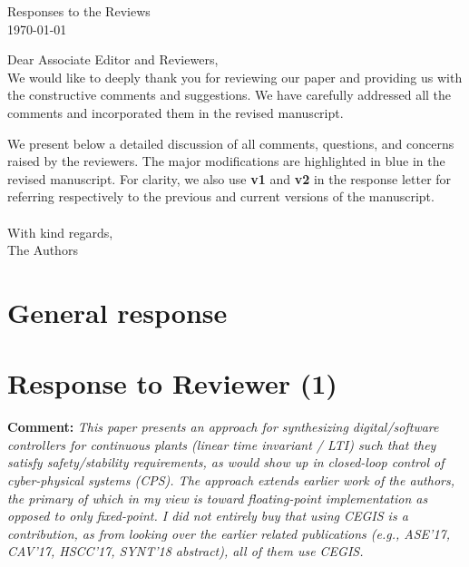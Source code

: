 \documentclass{article}
\newcommand{\vold}[1]{\colorbox{red!20}{\bfseries #1}}
\newcommand{\vnew}[1]{\colorbox{blue!30}{\bfseries #1}}
\begin{document}
\begin{center}
{\Large Responses to the Reviews}\\\vspace{0.3cm}
\today
\end{center}
\vspace{1cm}
Dear Associate Editor and Reviewers,\vspace{0.3cm}
\\
We would like to deeply thank you for reviewing our paper and providing us with the constructive comments and suggestions. We have carefully addressed
all the comments and incorporated them in the revised manuscript.

We present below a detailed discussion of all comments, questions, and concerns raised by the reviewers. The major modifications are highlighted in
blue in the revised manuscript. For clarity,  we also use \vold{v1} and \vnew{v2} in the response letter for referring respectively to the previous
and current versions of the manuscript.
\\
\\
With kind regards,\vspace{0.1cm}
\\
The Authors
%
\newpage

\section{General response}




\section{Response to Reviewer (1)}
\bigskip

{\bf Comment: }{\itshape This paper presents an approach for synthesizing 
digital/software controllers for continuous plants (linear time invariant / LTI) 
such that they satisfy safety/stability requirements, as would show up in closed-loop 
control of cyber-physical systems (CPS). The approach extends earlier work of the authors, 
the primary of which in my view is toward floating-point implementation as opposed to only fixed-point. 
I did not entirely buy that using CEGIS is a contribution, as from looking over the earlier related publications 
(e.g., ASE'17, CAV'17, HSCC'17, SYNT'18 abstract), all of them use CEGIS.}

\vspace{1em}
\end{document}
